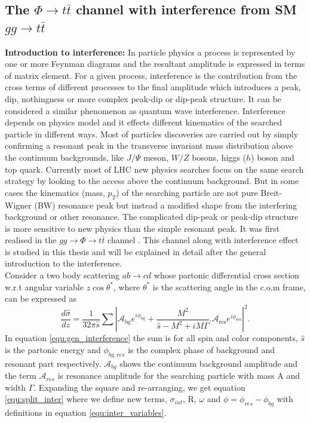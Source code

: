 \noindent \subsection{The $\Phi \rightarrow t\bar{t}$ channel with interference from SM $gg \rightarrow t\bar{t}$}
\textbf{Introduction to interference:} In particle physics a process is represented by one or more Feynman diagrams and the resultant amplitude is expressed in terms of matrix element. For a given process, interference is the contribution from the cross terms of different processes to the final amplitude which introduces a peak, dip, nothingness or more complex peak-dip or dip-peak structure. It can be considered a similar phenomenon as quantum wave interference. Interference depends on physics model and it effects different kinematics of the searched particle in different ways. Most of particles discoveries are carried out by simply confirming a resonant peak in the transverse invariant mass distribution above the continuum backgrounds, like $J/\Psi$ meson, $W/Z$ bosons, higgs ($h$) boson and top quark. Currently most of LHC new physics searches focus on the same search strategy by looking to the access above the continuum background. But in some cases the kinematics (mass, $p_{T}$) of the searching particle are not pure Breit-Wigner (BW) resonance peak but instead a modified shape from the interfering background or other resonance. The complicated dip-peak or peak-dip structure is more sensitive to new physics than the simple resonant peak. It was first realised in the $gg\rightarrow\Phi\rightarrow t\bar{t}$ channel \cite{Gaemers:1984}. This channel along with interference effect is studied in this thesis and will be explained in detail after the general introduction to the interference. \\
\noindent Consider a two body scattering $ab\rightarrow {cd}$ whose partonic differential cross section w.r.t angular variable $z\cos\theta^{*}$, where $\theta^{*}$ is the scattering angle in the c.o.m frame, can be expressed as \cite{Jung:2015gta}   
\begin{equation}\label{equ:gen_interference}
\frac{d\hat{\sigma}}{dz}=\frac{1}{32\pi\hat{s}}\sum \left| \mathcal{A}_{\text{bg}}e^{i\phi_{\text{bg}}}+\frac{M^{2}}{\hat{s}-M^{2}+iM\Gamma}.\mathcal{A}_{\text{res}}e^{i\phi_{\text{res}}} \right|^{2}.
\end{equation}
In equation \ref{equ:gen_interference} the sum is for all spin and color components, $\hat{s}$ is the partonic energy and $\phi_{bg,res}$ is the complex phase of background and resonant part respectively. $\mathcal{A}_{bg}$ shows the continuum background amplitude and the term $\mathcal{A}_{res}$ is resonance amplitude for the searching particle with mass A and width $\Gamma$. Expanding the square and re-arranging, we get equation \ref{equ:split_inter} where we define new terms, $\sigma_{int}$, R, $\omega$ and $\phi = \phi_{res}-\phi_{bg}$ with definitions in equation \ref{equ:inter_variables}.  

